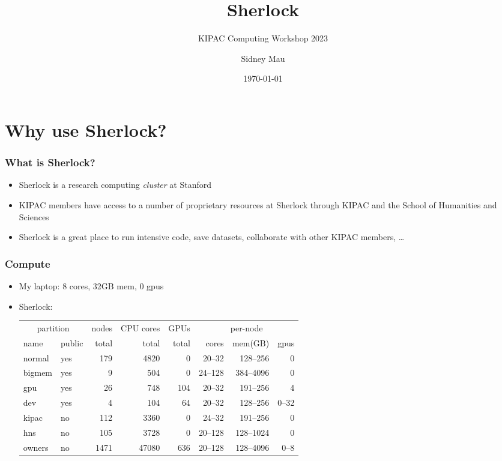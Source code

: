 \documentclass[aspectratio=169]{beamer}
\title{Sherlock}
\subtitle{KIPAC Computing Workshop 2023}
\author[S. Mau]{Sidney Mau}
\institute[Stanford]{Stanford University}
\date[\today]{\today}
\begin{document}

\frame{\titlepage}



\section{Why use Sherlock?}

\frame{\sectionpage}

\begin{frame}
	\frametitle{What is Sherlock?}
	\begin{itemize}
		\item Sherlock is a research computing \emph{cluster} at Stanford
		\item KIPAC members have access to a number of proprietary resources at Sherlock through KIPAC and the School of Humanities and Sciences
		\item Sherlock is a great place to run intensive code, save datasets, collaborate with other KIPAC members, \dots
	\end{itemize}
\end{frame}

\begin{frame}
	\frametitle{Compute}
	\begin{itemize}
		\item My laptop: 8 cores, 32GB mem, 0 gpus
		\item Sherlock:
			\begin{center}
				\begin{tabular}{|l|l||r|r|r||r|r|r|}
					\hline
					\multicolumn{2}{|c||}{partition} & nodes & CPU cores & GPUs & \multicolumn{3}{|c|}{per-node} \\
					name   & public & total & total & total &   cores &   mem(GB) &  gpus \\
					\hline
					normal & yes    &   179 &  4820 &     0 &  20--32 &  128--256 &     0 \\
					bigmem & yes    &     9 &   504 &     0 & 24--128 & 384--4096 &     0 \\
					gpu    & yes    &    26 &   748 &   104 &  20--32 &  191--256 &     4 \\
					dev    & yes    &     4 &   104 &    64 &  20--32 &  128--256 & 0--32 \\
					\hline
					kipac  & no     &   112 &  3360 &     0 &  24--32 &  191--256 &     0 \\
					hns    & no     &   105 &  3728 &     0 & 20--128 & 128--1024 &     0 \\
					\hline
					owners & no     &  1471 & 47080 &   636 & 20--128 & 128--4096 &  0--8 \\
					\hline
				\end{tabular}
			\end{center}
	\end{itemize}
\end{frame}
\end{document}
